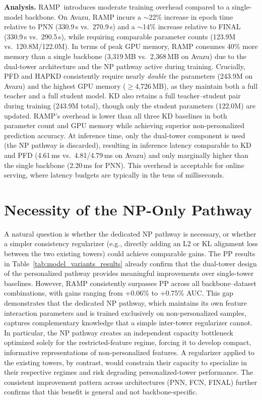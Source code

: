 \textbf{Analysis.} RAMP~introduces moderate training overhead compared to a single-model backbone. On Avazu, RAMP incurs a $\sim$22\% increase in epoch time relative to PNN (330.9\,s vs.\ 270.9\,s) and a $\sim$14\% increase relative to FINAL (330.9\,s vs.\ 290.5\,s), while requiring comparable parameter counts (123.9M vs.\ 120.8M/122.0M). In terms of peak GPU memory, RAMP consumes 40\% more memory than a single backbone (3{,}319\,MB vs.\ 2{,}368\,MB on Avazu) due to the dual-tower architecture and the NP pathway active during training. Crucially, PFD and HAPKD consistently require nearly \emph{double} the parameters (243.9M on Avazu) and the highest GPU memory ($\geq$4{,}726\,MB), as they maintain both a full teacher and a full student model. KD also retains a full teacher--student pair during training (243.9M total), though only the student parameters (122.0M) are updated. RAMP's overhead is lower than all three KD baselines in both parameter count and GPU memory while achieving superior non-personalized prediction accuracy. At inference time, only the dual-tower component is used (the NP pathway is discarded), resulting in inference latency comparable to KD and PFD (4.61\,ms vs.\ 4.81/4.79\,ms on Avazu) and only marginally higher than the single backbone (2.20\,ms for PNN). This overhead is acceptable for online serving, where latency budgets are typically in the tens of milliseconds.

\section{Necessity of the NP-Only Pathway}
\label{sec:np_pathway_necessity}
A natural question is whether the dedicated NP pathway is necessary, or whether a simpler consistency regularizer (e.g., directly adding an L2 or KL alignment loss between the two existing towers) could achieve comparable gains. The PP results in Table~\ref{tab:model_variants_results} already confirm that the dual-tower design of the personalized pathway provides meaningful improvements over single-tower baselines. However, RAMP consistently surpasses PP across all backbone--dataset combinations, with gains ranging from +0.06\% to +0.75\% AUC. This gap demonstrates that the dedicated NP pathway, which maintains its own feature interaction parameters and is trained exclusively on non-personalized samples, captures complementary knowledge that a simple inter-tower regularizer cannot. In particular, the NP pathway creates an independent capacity bottleneck optimized solely for the restricted-feature regime, forcing it to develop compact, informative representations of non-personalized features. A regularizer applied to the existing towers, by contrast, would constrain their capacity to specialize in their respective regimes and risk degrading personalized-tower performance. The consistent improvement pattern across architectures (PNN, FCN, FINAL) further confirms that this benefit is general and not backbone-specific.

